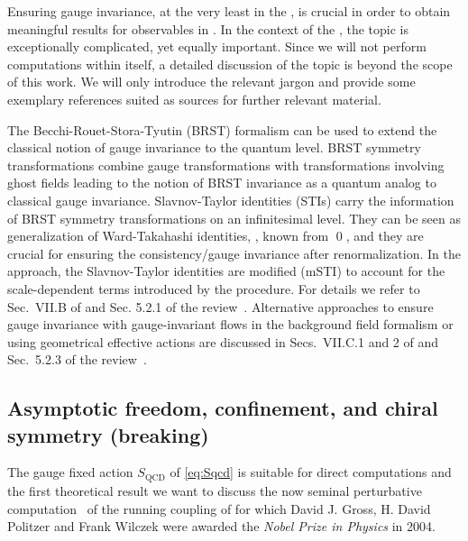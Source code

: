 Ensuring gauge invariance, at the very least in the \ir{}, is crucial in order to obtain meaningful results for observables in \qcd{}.
In the context of the \frg{}, the topic is exceptionally complicated, yet equally important.
Since we will not perform computations within \qcd{} itself, a detailed discussion of the topic is beyond the scope of this work.
We will only introduce the relevant jargon and provide some exemplary references suited as sources for further relevant material.

The Becchi-Rouet-Stora-Tyutin (BRST) formalism can be used to extend the classical notion of gauge invariance to the quantum level. 
BRST symmetry transformations combine gauge transformations with transformations involving ghost fields leading to the notion of BRST invariance as a quantum analog to classical gauge invariance.
Slavnov-Taylor identities (STIs) carry the information of BRST symmetry transformations on an infinitesimal level.
They can be seen as generalization of Ward-Takahashi identities, \eg{}, known from \qed{}, and they are crucial for ensuring the consistency/gauge invariance after renormalization.
In the \frg{} approach, the Slavnov-Taylor identities are modified (mSTI) to account for the scale-dependent terms introduced by the \frg{} procedure.
For details we refer to Sec.~VII.B of  and Sec. 5.2.1 of the review~\cite{Dupuis:2020fhh}.
Alternative approaches to ensure gauge invariance with gauge-invariant flows in the background field formalism or using geometrical effective actions are discussed in Secs.~VII.C.1 and 2 of  and Sec.~5.2.3 of the review~\cite{Dupuis:2020fhh}.

\subsection{Asymptotic freedom, confinement, and chiral symmetry (breaking)}\label{subsec:aFcSB}
The gauge fixed action $S_\mathrm{QCD}$ of \cref{eq:Sqcd} is suitable for direct computations and the first theoretical result we want to discuss the now seminal perturbative computation~\cite{Gross:1973id,Politzer:1973fx} of the running coupling of \qcd{} for which David J. Gross, H. David Politzer and Frank Wilczek were awarded the \textit{Nobel Prize in Physics} in 2004.

